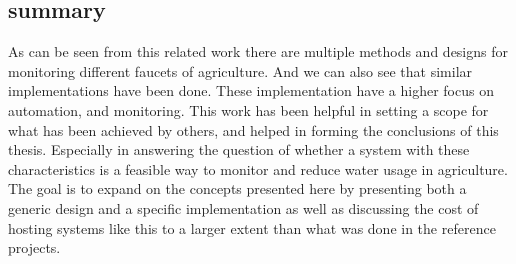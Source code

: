 \documentclass[]{uiophd}
\begin{document}
\subsection{summary}
As can be seen from this related work there are multiple methods and designs for monitoring different faucets of agriculture. And we can also see that similar implementations have been done. These implementation have a higher focus on automation, and monitoring. This work has been helpful in setting a scope for what has been achieved by others, and helped in forming the conclusions of this thesis. Especially in answering the question of whether a system with these characteristics is a feasible way to monitor and reduce water usage in agriculture. The goal is to expand on the concepts presented here by presenting both a generic design and a specific implementation as well as discussing the cost of hosting systems like this to a larger extent than what was done in the reference projects.
\end{document}
